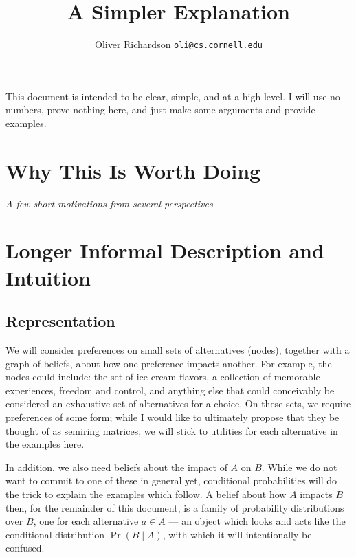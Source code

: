 \documentclass{article}
\title{A Simpler Explanation}
\author{Oliver Richardson  \texttt{oli@cs.cornell.edu}}
\begin{document}
	This document is intended to be clear, simple, and at a high level. %
	I will use no numbers, prove nothing here, and just make some arguments and provide examples.
	

	\section{Why This Is Worth Doing}
	\vspace{-1em}
	\textit{A few short motivations from several perspectives}
	
	
	

	
	
	

	\section{Longer Informal Description and Intuition}
	
	\subsection{Representation}
	We will consider preferences on small sets of alternatives (nodes), together with a graph of beliefs, about how one preference impacts another. For example, the nodes could include: the set of ice cream flavors, a collection of memorable experiences, freedom and control, and anything else that could conceivably be considered an exhaustive set of alternatives for a choice. On these sets, we require preferences of some form; while I would like to ultimately propose that they be thought of as semiring matrices, we will stick to utilities for each alternative in the examples here.
	
	In addition, we also need beliefs about the impact of $A$ on $B$. While we do not want to commit to one of these in general yet, conditional probabilities will do the trick to explain the examples which follow. A belief about how $A$ impacts $B$ then, for the remainder of this document, is a family of probability distributions over $B$, one for each alternative $a \in A$ --- an object which looks and acts like the conditional distribution $\Pr(B \mid A)$, with which it will intentionally be confused.
	
\end{document}
